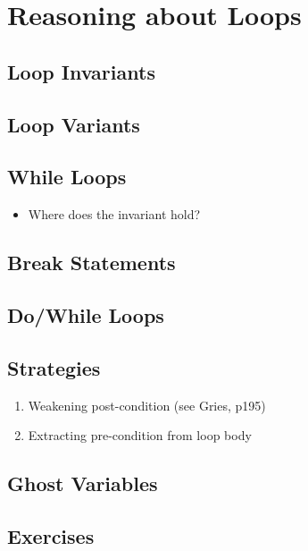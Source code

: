 \chapter{Reasoning about Loops}

\section{Loop Invariants}
\section{Loop Variants}
\section{While Loops}
\begin{itemize}
\item Where does the invariant hold?
\end{itemize}
\section{Break Statements}
\section{Do/While Loops}
\section{Strategies}
\begin{enumerate}
\item Weakening post-condition (see Gries, p195)
\item Extracting pre-condition from loop body
\end{enumerate}
\section{Ghost Variables}


\section{Exercises}

\begin{ex}
\end{ex}